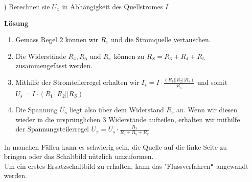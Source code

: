 										) Berechnen sie $U_x$ in Abhängigkeit des Quellstromes $I$
										\begin{center}
											\fix
										\end{center}
										\fix
										 \textbf{Lösung}
									 \begin{enumerate}
					  				 \item Gemäss Regel 2 können wir $R_1$ und die Stromquelle vertauschen.
										 \item Die Widerstände $R_4 , R_5$ und $ R_x $ können zu $ R_S = R_3 + R_4 + R_5 $ zusammengefasst werden.
										 \item Mithilfe der Stromteilerregel erhalten wir $ I_s = I \cdot \frac{(R_1 || R_2 || R_s)}{R_s} $ und somit $U_s = I \cdot (R_1 || R_2 || R_S) $
										 \item Die Spannung $U_s$ liegt also über dem Widerstand $R_s$ an. Wenn wir diesen wieder in die ursprünglichen 3 Widerstände aufteilen, erhalten wir mithilfe der Spannungsteilerregel $U_x = U_s \cdot \frac{R_x}{R_4 + R_5 + R_x} $
									 \end{enumerate}

										\iend

										In manchen Fällen kann es schwierig sein, die Quelle auf die linke Seite zu bringen oder das Schaltbild nützlich umzuformen. \\
										Um ein erstes Ersatzschaltbild zu erhalten, kann das "Flussverfahren\texttt{"} angewandt werden.

